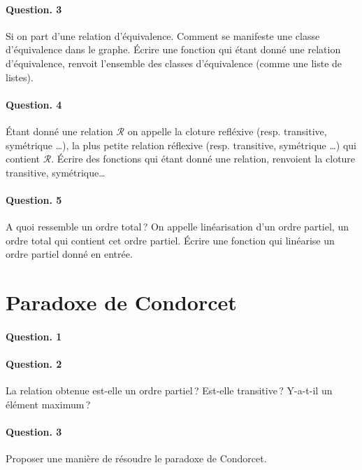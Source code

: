 \documentclass[10pt,a4paper]{article}
\begin{document}
\paragraph{Question. 3\\}
Si on part d'une relation d'équivalence. Comment se manifeste une classe
d'équivalence dans le graphe. Écrire une fonction qui étant donné une
relation d'équivalence, renvoit l'ensemble des classes d'équivalence
(comme une liste de listes).

\paragraph{Question. 4\\}
Étant donné une relation $\mathcal{R}$ on appelle la cloture refléxive (resp. transitive,
symétrique \dots), la plus petite relation réflexive (resp. transitive,
symétrique \dots) qui contient $\mathcal{R}$. Écrire des fonctions qui
étant donné une relation, renvoient la cloture transitive, symétrique\dots

\paragraph{Question. 5\\}
A quoi ressemble un ordre total\,? On appelle linéarisation d'un ordre
partiel, un ordre total qui contient cet ordre partiel. Écrire une
fonction qui linéarise un ordre partiel donné en entrée.
 
\section{Paradoxe de Condorcet}

\paragraph{Question. 1\\}

\paragraph{Question. 2\\}
La relation obtenue est-elle un ordre partiel\,? Est-elle transitive\,?
Y-a-t-il un élément maximum\,?

\paragraph{Question. 3\\}
Proposer une manière de résoudre le paradoxe de Condorcet.
\end{document}
